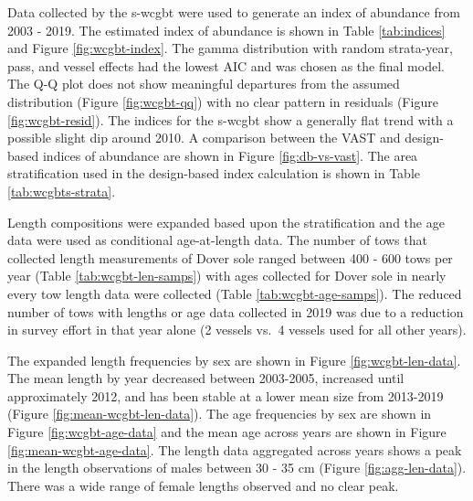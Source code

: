 \documentclass[11pt,
  english,
  a4paper,
]{article}
\begin{document}
Data collected by the \gls{s-wcgbt} were used to generate an index of abundance from 2003 - 2019. The estimated index of abundance is shown in Table \ref{tab:indices} and Figure \ref{fig:wcgbt-index}. The gamma distribution with random strata-year, pass, and vessel effects had the lowest AIC and was chosen as the final model. The Q-Q plot does not show meaningful departures from the assumed distribution (Figure \ref{fig:wcgbt-qq}) with no clear pattern in residuals (Figure \ref{fig:wcgbt-resid}). The indices for the \gls{s-wcgbt} show a generally flat trend with a possible slight dip around 2010. A comparison between the VAST and design-based indices of abundance are shown in Figure \ref{fig:db-vs-vast}. The area stratification used in the design-based index calculation is shown in Table \ref{tab:wcgbts-strata}.

\leavevmode\tagmcend\tagstructend\par


Length compositions were expanded based upon the stratification and the age data were used as conditional age-at-length data. The number of tows that collected length measurements of Dover sole ranged between 400 - 600 tows per year (Table \ref{tab:wcgbt-len-samps}) with ages collected for Dover sole in nearly every tow length data were collected (Table \ref{tab:wcgbt-age-samps}). The reduced number of tows with lengths or age data collected in 2019 was due to a reduction in survey effort in that year alone (2 vessels vs.~4 vessels used for all other years).

\leavevmode\tagmcend\tagstructend\par


The expanded length frequencies by sex are shown in Figure \ref{fig:wcgbt-len-data}. The mean length by year decreased between 2003-2005, increased until approximately 2012, and has been stable at a lower mean size from 2013-2019 (Figure \ref{fig:mean-wcgbt-len-data}). The age frequencies by sex are shown in Figure \ref{fig:wcgbt-age-data} and the mean age across years are shown in Figure \ref{fig:mean-wcgbt-age-data}. The length data aggregated across years shows a peak in the length observations of males between 30 - 35 cm (Figure \ref{fig:agg-len-data}). There was a wide range of female lengths observed and no clear peak.

\leavevmode\tagmcend\tagstructend\par
\end{document}
